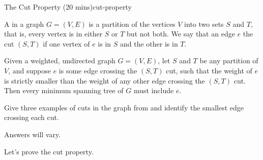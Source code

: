 \documentclass{tufte-handout}
\begin{document}
\pause

\begin{model*}{The Cut Property (20 mins)}{cut-property}
  \begin{center}
    
  \end{center}

  \begin{defn}
    A  in a graph $G = (V,E)$ is a partition of the vertices
    $V$ into two sets $S$ and $T$, that is, every vertex is in either
    $S$ or $T$ but not both.  We say that an edge $e$ 
    the cut $(S,T)$ if one vertex of $e$ is in $S$ and the other is in
    $T$.
  \end{defn}

  \begin{thm}
    Given a weighted, undirected graph $G = (V,E)$, let $S$ and $T$ be
    any partition of $V$, and suppose $e$ is some edge crossing the
    $(S,T)$ cut, such that the weight of $e$ is strictly smaller than
    the weight of any other edge crossing the $(S,T)$ cut.  Then every
    minimum spanning tree of $G$ must include $e$.
  \end{thm}
\end{model*}

\begin{questions}
\item Give three examples of cuts in the graph from
   and identify the smallest edge crossing
  each cut.

  \begin{answer}
    Answers will vary.
  \end{answer}
\end{questions}

Let's prove the cut property.
\end{document}
